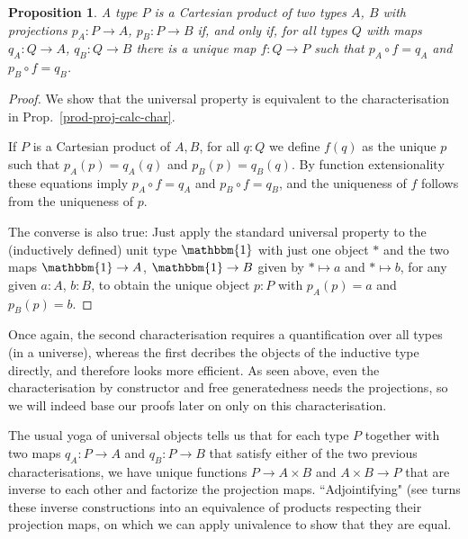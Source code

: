 \documentclass{amsart}
\theoremstyle{plain}
\numberwithin{equation}{section} %
\numberwithin{figure}{section} %
\theoremstyle{plain}
\theoremstyle{plain}
\theoremstyle{plain}
\theoremstyle{plain}
\theoremstyle{plain}
\newtheorem{prop}[thm]{Proposition} %
\theoremstyle{plain}
\theoremstyle{remark}
\theoremstyle{remark}
\theoremstyle{remark}
\begin{document}
\begin{prop}  %
A type $P$ is a Cartesian product of two types $A$, $B$ with projections $p_A : P \rightarrow A$, $p_B : P \rightarrow B$ if, and only if, for all types $Q$ with maps $q_A : Q \rightarrow A$, $q_B : Q \rightarrow B$ there is a unique map $f : Q \rightarrow P$ such that $p_A \circ f = q_A$ and $p_B \circ f = q_B$.
\end{prop}
\begin{proof}
We show that the universal property is equivalent to the characterisation in Prop.~\ref{prod-proj-calc-char}.

If $P$ is a Cartesian product of $A, B$, for all $q : Q$ we define $f(q)$ as the unique $p$ such that $p_A(p) = q_A(q)$ and $p_B(p) = q_B(q)$. By function extensionality these equations imply $p_A \circ f = q_A$ and $p_B \circ f = q_B$, and the uniqueness of $f$ follows from the uniqueness of $p$.

The converse is also true: Just apply the standard universal property to the (inductively defined) unit type $\mathbbm{1}$ with just one object $\ast$ and the two maps $\mathbbm{1} \rightarrow A$, $\mathbbm{1} \rightarrow B$ given by $\ast \mapsto a$ and $\ast \mapsto b$, for any given $a : A$, $b : B$, to obtain the unique object $p : P$ with $p_A(p) = a$ and $p_B(p) = b$.
\end{proof}

Once again, the second characterisation requires a quantification over all types (in a universe), whereas the first decribes the objects of the inductive type directly, and therefore looks more efficient. As seen above, even the characterisation by constructor and free generatedness needs the projections, so we will indeed base our proofs later on only on this characterisation.

The usual yoga of universal objects tells us that for each type $P$ together with two maps $q_A : P \rightarrow A$ and $q_B : P \rightarrow B$ that satisfy either of the two previous characterisations, we have unique functions $P \rightarrow A \times B$ and $A \times B \rightarrow P$ that are inverse to each other and factorize the projection maps. ``Adjointifying" (see \cite[Thm.4.2.3]{HoTTBook} turns these inverse constructions into an equivalence of products respecting their projection maps, on which we can apply univalence to show that they are equal.
\end{document}

